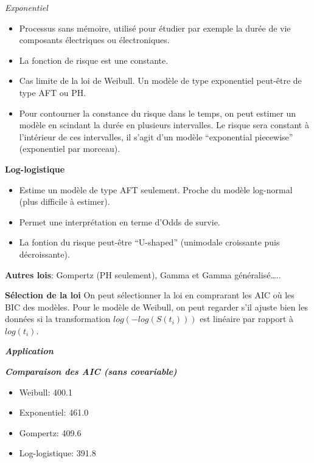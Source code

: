 \documentclass[
  12pt,
  letterpaper,
  DIV=11,
  numbers=noendperiod,
  onepage,
  openany]{scrreprt}
\providecommand{\tightlist}{%
  \setlength{\itemsep}{0pt}\setlength{\parskip}{0pt}}\usepackage{longtable,booktabs,array}
\begin{document}
\emph{Exponentiel}

\begin{itemize}
\tightlist
\item
  Processus sans mémoire, utilisé pour étudier par exemple la durée de
  vie composants électriques ou électroniques.
\item
  La fonction de risque est une constante.
\item
  Cas limite de la loi de Weibull. Un modèle de type exponentiel
  peut-être de type AFT ou PH.
\item
  Pour contourner la constance du risque dans le temps, on peut estimer
  un modèle en scindant la durée en plusieurs intervalles. Le risque
  sera constant à l'intérieur de ces intervalles, il s'agit d'un modèle
  ``exponential piecewise'' (exponentiel par morceau).
\end{itemize}

\textbf{Log-logistique}

\begin{itemize}
\tightlist
\item
  Estime un modèle de type AFT seulement. Proche du modèle log-normal
  (plus difficile à estimer).
\item
  Permet une interprétation en terme d'Odds de survie.
\item
  La fontion du risque peut-être ``U-shaped'' (unimodale croissante puis
  décroissante).
\end{itemize}

\textbf{Autres lois}: Gompertz (PH seulement), Gamma et Gamma
généralisé\ldots..

\textbf{Sélection de la loi} On peut sélectionner la loi en comprarant
les AIC où les BIC des modèles. Pour le modèle de Weibull, on peut
regarder s'il ajuste bien les données si la transformation
\(log(-log(S(t_i)))\) est linéaire par rapport à \(log(t_i)\).

\textbf{\emph{Application}}

\textbf{\emph{Comparaison des AIC (sans covariable)}}

\begin{itemize}
\tightlist
\item
  Weibull: 400.1\\
\item
  Exponentiel: 461.0\\
\item
  Gompertz: 409.6\\
\item
  Log-logistique: 391.8
\end{itemize}
\end{document}
